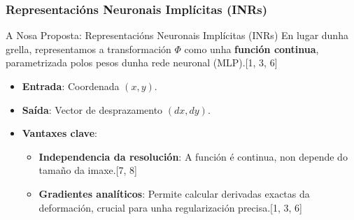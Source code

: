 \documentclass[xcolor=dvipsnames]{beamer}
\begin{document}
\begin{frame}
    \frametitle{Representacións Neuronais Implícitas (INRs)}
    \begin{block}{A Nosa Proposta: Representacións Neuronais Implícitas (INRs)}
        En lugar dunha grella, representamos a transformación $\Phi$ como unha \textbf{función continua}, parametrizada polos pesos dunha rede neuronal (MLP).[1, 3, 6]
        \begin{itemize}
            \item \textbf{Entrada}: Coordenada $(x, y)$.
            \item \textbf{Saída}: Vector de desprazamento $(dx, dy)$.
            \item \textbf{Vantaxes clave}:
            \begin{itemize}
                \item \textbf{Independencia da resolución}: A función é continua, non depende do tamaño da imaxe.[7, 8]
                \item \textbf{Gradientes analíticos}: Permite calcular derivadas exactas da deformación, crucial para unha regularización precisa.[1, 3, 6]
            \end{itemize}
        \end{itemize}
    \end{block}
\end{frame}
  
\end{document}
